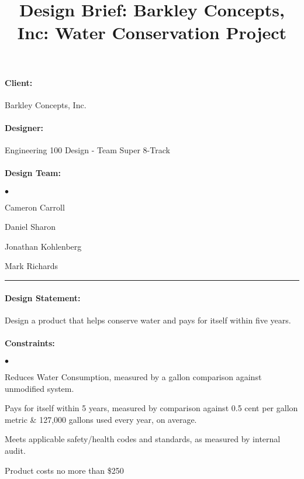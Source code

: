 \documentclass[11pt]{article}
\newcommand{\squishlist}{
 \begin{list}{$\bullet$}
  { \setlength{\itemsep}{0pt}
     \setlength{\parsep}{3pt}
     \setlength{\topsep}{3pt}
     \setlength{\partopsep}{0pt}
     \setlength{\leftmargin}{1.5em}
     \setlength{\labelwidth}{1em}
     \setlength{\labelsep}{0.5em} } }
\newcommand{\squishend}{
  \end{list}  }
\begin{document}
\title{Design Brief: Barkley Concepts, Inc: Water Conservation Project}
\maketitle
\paragraph{Client:} Barkley Concepts, Inc.

\paragraph{Designer: } Engineering 100 Design - Team Super 8-Track
\paragraph{Design Team:}
\squishlist
\item Cameron Carroll \\[-0.4cm]
\item Daniel Sharon \\[-0.4cm]
\item Jonathan Kohlenberg \\[-0.4cm]
\item Mark Richards \\[-0.4cm]
\squishend

\hrule

\paragraph{Design Statement: } Design a product that helps conserve water and pays for itself within five years. \\[-0.4cm]

\paragraph{Constraints: }
\squishlist
\item Reduces Water Consumption, measured by a gallon comparison against unmodified system. \\[-0.4cm]
\item Pays for itself within 5 years, measured by comparison against 0.5 cent per gallon metric \& 127,000 gallons used every year, on average. \\[-0.4cm]
\item Meets applicable safety/health codes and standards, as measured by internal audit. \\[-0.4cm]
\item Product costs no more than \$250 \\[-0.4cm]
\squishend
\end{document}
